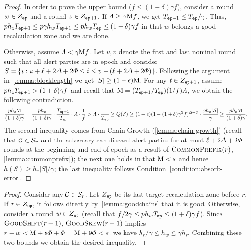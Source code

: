 \begin{proof}
    In order to prove the upper bound ($f \le (1 + \delta) \gamma f$), consider a round $w \in Z_\mathtt{ep}$ and a round $z \in Z_{\mathtt{ep} + 1}$.
    If $\varLambda \ge \gamma \mathrm{M} f $, we get $T_{\mathtt{ep} + 1} \le T_\mathtt{ep} / \gamma$.
    Thus, $p h_z T_{\mathtt{ep} + 1} \le p \gamma h_w T_{\mathtt{ep} + 1} \le p h_w T_\mathtt{ep} \le (1 + \delta) \gamma f$ in that $w$ belongs a good recalculation zone and we are done.

    Otherwise, assume $\varLambda < \gamma \mathrm{M} f$.
    Let $u, v$ denote the first and last nominal round such that all alert parties are in epoch \epoch and consider $S = \{i : u + \ell + 2\varDelta + 2\varPhi \le i \le v - (\ell + 2\varDelta + 2\varPhi) \}$.
    Following the argument in~\cref{lemma:blocklength} we get $|S| \ge (1 - \epsilon) \mathrm{M}$.
    For any $t \in Z_{\mathtt{ep} + 1}$, assume $p h_z T_{\mathtt{ep} + 1} > (1 + \delta) \gamma f$ and recall that $\mathrm{M} = (T_{\mathtt{ep} + 1} / T_\mathtt{ep}) (1 / f) \varLambda$, we obtain the following contradiction.
    \[ \frac{p h_z \mathrm{M}}{(1 + \delta) \gamma } = \frac{p h_z}{(1 + \delta) \gamma} \cdot \frac{T_{\mathtt{ep} + 1}}{T_{\mathtt{ep}}} \cdot \varLambda \cdot \frac{1}{f} > \varLambda \cdot \frac{1}{T_{\mathtt{ep}}} \ge Q(S) \ge (1 - \epsilon) (1 - (1 + \delta) \gamma^2 f)^{\varDelta + \varPhi} \cdot \frac{p h_z |S|}{\gamma} \ge \frac{p h_z \mathrm{M}}{(1 + \delta) \gamma}. \]
    The second inequality comes from Chain Growth (\cref{lemma:chain-growth}) (recall that $\mathcal{C} \in \mathcal{S}_r$ and the adversary can discard alert parties for at most $\ell + 2\varDelta + 2\varPhi$ rounds at the beginning and end of epoch as a result of $\textsc{CommonPrefix}(r)$, \cref{lemma:commonprefix}); the next one holds in that $\mathrm{M} < s$ and hence $h(S) \ge h_z |S| / \gamma$; the last inequality follows Condition~\eqref{condition:absorb-error}.
\end{proof}

\corollarygoodrounds

\begin{proof}
    Consider any $\mathcal{C} \in \mathcal{S}_r$.
    Let $Z_\mathtt{ep}$ be its last target recalculation zone before $r$.
    If $r \in Z_\mathtt{ep}$, it follows directly by~\cref{lemma:goodchains} that it is good.
    Otherwise, consider a round $w \in Z_\mathtt{ep}$ (recall that $f / 2\gamma \le p h_w T_{\mathtt{ep}} \le (1 + \delta) \gamma f$).
    Since $\textsc{GoodShift}(r - 1)$, $\textsc{GoodSkew}(r - 1)$ implies $r - w < \mathrm{M} + 8\varPhi + \varPhi = \mathrm{M} + 9\varPhi < s$, we have $h_r / \gamma \le h_w \le \gamma h_r$.
    Combining these two bounds we obtain the desired inequality.
\end{proof}
